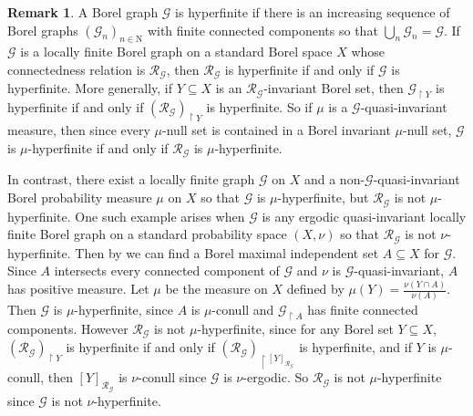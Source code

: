 \documentclass[11pt]{amsart}
\theoremstyle{definition}
\newtheorem{remark}[definition]{Remark}
\theoremstyle{plain}
\newcommand{\<}{\langle}
\renewcommand{\>}{\rangle}
\newcommand{\inters}{\cap}
\newcommand{\N}{\bm{\mathrm{N}}}
\newcommand{\Ggraph}{\mathcal{G}}
\newcommand\RR{\mathscr{R}}
\begin{document}
\begin{remark} 
A Borel graph $\Ggraph$ is hyperfinite if there is an increasing sequence of
Borel graphs $(\Ggraph_n)_{n \in \N}$ with finite connected components so that
$\bigcup_n \Ggraph_n = \Ggraph$. If $\Ggraph$ is a locally finite Borel graph on a standard
Borel space $X$ whose connectedness relation is $\RR_\Ggraph$, then $\RR_\Ggraph$ is
hyperfinite if and only if $\Ggraph$ is hyperfinite. More generally, if $Y
\subseteq X$ is an $\RR_\Ggraph$-invariant Borel set, then $\Ggraph_{\restriction Y}$ is
hyperfinite if and only if $(\RR_\Ggraph)_{\restriction Y}$ is hyperfinite. So if $\mu$
is a $\Ggraph$-quasi-invariant measure, then since every $\mu$-null set is contained in
a Borel invariant $\mu$-null set, $\Ggraph$ is $\mu$-hyperfinite if and only if
$\RR_\Ggraph$ is $\mu$-hyperfinite.

In contrast, there exist a locally finite graph $\Ggraph$ on $X$ and a
non-$\Ggraph$-quasi-invariant Borel probability measure $\mu$ on $X$ so that $\Ggraph$ is
$\mu$-hyperfinite, but $\RR_\Ggraph$ is not
$\mu$-hyperfinite. One such example arises when $\Ggraph$ is any ergodic
quasi-invariant locally finite Borel graph on a standard probability space
$(X,\nu)$ so that $\RR_{\Ggraph}$ is
not $\nu$-hyperfinite. Then by \cite[Proposition 4.2]{KST99} we can find a Borel maximal
independent set $A \subseteq X$ for $\Ggraph$. Since $A$ intersects every
connected component of $\Ggraph$ and $\nu$ is $\Ggraph$-quasi-invariant, $A$ has positive
measure. Let $\mu$ be the measure on $X$ defined by
$\mu(Y) = \frac{\nu(Y \inters A)}{\nu(A)}$. Then $\Ggraph$ is
$\mu$-hyperfinite, since $A$ is $\mu$-conull and $\Ggraph_{\restriction A}$ has finite connected
components. However $\RR_\Ggraph$ is not $\mu$-hyperfinite, since for any Borel
set $Y \subseteq X$, $(\RR_\Ggraph)_{\restriction
Y}$ is hyperfinite if and only
if $(\RR_\Ggraph)_{\restriction [Y]_{\RR_\Ggraph}}$ is hyperfinite, and if $Y$ is $\mu$-conull,
then $[Y]_{\RR_\Ggraph}$ is $\nu$-conull since $\Ggraph$ is $\nu$-ergodic. So
$\RR_\Ggraph$ is not
$\mu$-hyperfinite since $\Ggraph$ is not $\nu$-hyperfinite.
\end{remark}
\end{document}
